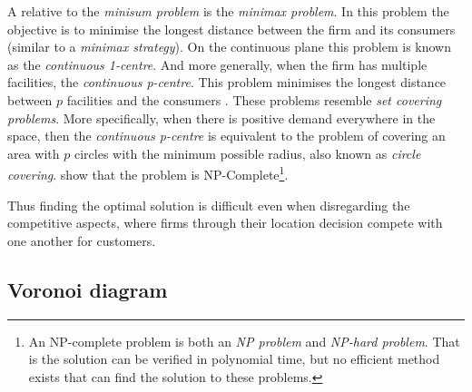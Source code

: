 \documentclass[preprint, 12pt]{elsarticle}
\begin{document}
A relative to the \emph{minisum problem} is the \emph{minimax problem}. In this problem the objective is to minimise the longest distance between the firm and its consumers (similar to a \emph{minimax strategy}). On the continuous plane this problem is known as the \emph{continuous 1-centre}. And more generally, when the firm has multiple facilities, the \emph{continuous p-centre}. This problem minimises the longest distance between $p$ facilities and the consumers \citep[chapter~4]{Eiselt_Marianov_2011}. These problems resemble \emph{set covering problems}. More specifically, when there is positive demand everywhere in the space, then the \emph{continuous p-centre} is equivalent to the problem of covering an area with $p$ circles with the minimum possible radius, also known as \emph{circle covering}. \citet{Masuyama_Ibaraki_Hasegawa_1981} show that the problem is NP-Complete\footnote{An NP-complete problem is both an \emph{NP problem} and \emph{NP-hard problem}. That is the solution can be verified in polynomial time, but no efficient method exists that can find the solution to these problems.}.

Thus finding the optimal solution is difficult even when disregarding the competitive aspects, where firms through their location decision compete with one another for customers.


\subsection{Voronoi diagram}
\end{document}
